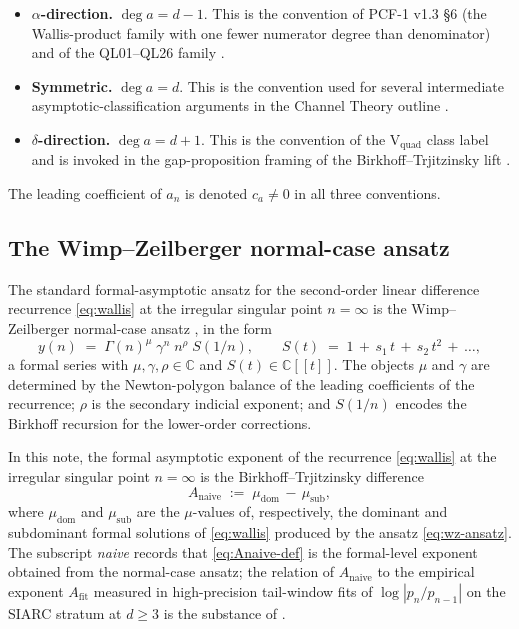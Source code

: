 \documentclass[11pt,reqno]{amsart}
\theoremstyle{plain}
\theoremstyle{definition}
\theoremstyle{remark}
\newcommand{\Anaive}{A_{\mathrm{naive}}}
\newcommand{\Afit}{A_{\mathrm{fit}}}
\newcommand{\dega}{\deg a}
\begin{document}
\begin{itemize}[leftmargin=2.2em]
\item \textbf{$\alpha$-direction.}
  $\dega = d - 1$.
  This is the convention of PCF-1 v1.3 \S6 (the Wallis-product
  family with one fewer numerator degree than denominator)
  and of the QL01--QL26 family
  \cite{papanokechi_pcf1_v13}.
\item \textbf{Symmetric.}
  $\dega = d$.
  This is the convention used for several intermediate
  asymptotic-classification arguments in the Channel Theory
  outline \cite{siarc_channel_theory_v13}.
\item \textbf{$\delta$-direction.}
  $\dega = d + 1$.
  This is the convention of the V$_{\mathrm{quad}}$ class label
  and is invoked in the gap-proposition framing of the
  Birkhoff--Trjitzinsky lift \cite{siarc_t1_phase2}.
\end{itemize}

The leading coefficient of $a_n$ is denoted $c_a \ne 0$ in all
three conventions.

\subsection{The Wimp--Zeilberger normal-case ansatz}
\label{sec:wz-ansatz-intro}
The standard formal-asymptotic ansatz for the second-order linear
difference recurrence \eqref{eq:wallis} at the irregular singular
point $n = \infty$ is the Wimp--Zeilberger normal-case ansatz
\cite[Ch.~6]{wimp1984computation}, in the form
\begin{equation}
\label{eq:wz-ansatz}
  y(n) \;=\; \Gamma(n)^{\mu}\;\gamma^{n}\;n^{\rho}\;S(1/n),
  \qquad
  S(t) \;=\; 1 \,+\, s_1\,t \,+\, s_2\,t^{2} \,+\, \dots,
\end{equation}
a formal series with $\mu, \gamma, \rho \in \mathbb{C}$ and
$S(t) \in \mathbb{C}[[t]]$. The objects $\mu$ and $\gamma$ are
determined by the Newton-polygon balance of the leading
coefficients of the recurrence; $\rho$ is the secondary
indicial exponent; and $S(1/n)$ encodes the Birkhoff
recursion for the lower-order corrections.

In this note, the formal asymptotic exponent of the recurrence
\eqref{eq:wallis} at the irregular singular point $n = \infty$
is the Birkhoff--Trjitzinsky difference
\begin{equation}
\label{eq:Anaive-def}
  \Anaive \;:=\; \mu_{\mathrm{dom}} \,-\, \mu_{\mathrm{sub}},
\end{equation}
where $\mu_{\mathrm{dom}}$ and $\mu_{\mathrm{sub}}$ are the
$\mu$-values of, respectively, the dominant and subdominant
formal solutions of \eqref{eq:wallis} produced by the
ansatz \eqref{eq:wz-ansatz}. The subscript \emph{naive}
records that \eqref{eq:Anaive-def} is the formal-level
exponent obtained from the normal-case ansatz; the relation
of $\Anaive$ to the empirical exponent $\Afit$ measured in
high-precision tail-window fits of $\log|p_n / p_{n-1}|$ on
the SIARC stratum at $d \ge 3$ is the substance of
.
\end{document}

